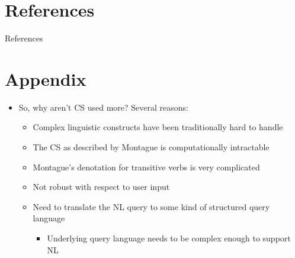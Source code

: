 \documentclass[logoontitle,tabu,supertabular,aspectratio=43]{preney-uwindsor-beamer}
\begin{document}


	\section{References}
	\begin{frame}[allowframebreaks]{References}
	\printbibliography
	\end{frame}

	\section{Appendix}
	\begin{frame}{\insertsection}
		\begin{itemize}
			\item So, why aren't CS used more?  Several reasons:
			\begin{itemize}
				\item Complex linguistic constructs have been traditionally hard to handle
				\item The CS as described by Montague is computationally intractable
				\item Montague's denotation for transitive verbs is very complicated
				\item Not robust with respect to user input
				\item Need to translate the NL query to some kind of structured query language \cite{hoffart2013yago2}
				\begin{itemize}
					\item Underlying query language needs to be complex enough to support NL
				\end{itemize}
			\end{itemize}
		\end{itemize}
	\end{frame}
\end{document}
